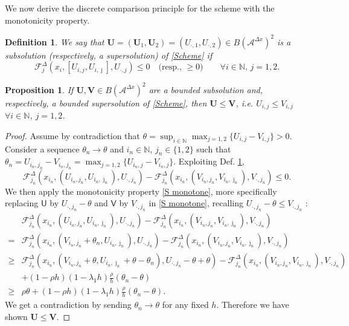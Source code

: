 \documentclass[11pt]{article}
\numberwithin{equation}{section}
\newtheorem{proposition}[theorem]{Proposition}
\newtheorem{definition}[theorem]{Definition}
\theoremstyle{Claim}
\newcommand{\N}{\mathbb{N}}
\newcommand{\mA}{\mathcal A}
\def\sU{{\mathsf{U}}}
\def\sV{{\mathsf{V}}}
\def\bV{{\mathbf{V}}}
\def\bjm{{\bar{\jmath}}}
\newcommand{\bU}{\mathbf{U}}
\theoremstyle{plain}
\newcommand{\D}{\Delta}
\newcommand{\Dx}{{\Delta x}}
\begin{document}
We now derive the discrete comparison principle for the scheme with the monotonicity property. 
\begin{definition}\label{def:sol_scheme}
	We say that $\mathbf{U}=(\bU_1,\bU_2)=(U_{\cdot,1},U_{\cdot,2})\in B(\mA^\Dx)^2$ is a subsolution (respectively, a supersolution) of \eqref{Scheme} if 
	\[	\mathcal{F}^\D_j(x_i,[U_{i,j},U_{i,\bar \jmath}],U_{\cdot,j})\le 0 \quad\text{(resp., $\ge 0$)}\qquad \forall i\in\N, \,j=1,2.\]
\end{definition}
\begin{proposition}\label{prop:comparison}
	If $\bU, \bV\in B(\mA^\Dx)^2$ are a bounded subsolution and, respectively, a bounded supersolution of \eqref{Scheme}, then $\bU\le \bV$, i.e. $U_{i,j}\le V_{i,j}$ $\forall i\in\N$, $j=1,2$.
\end{proposition}
\begin{proof}
	Assume by contradiction that $\theta=\sup_{i\in\N}\max_{j=1,2}\{U_{i,j}-V_{i,j}\}>0$. Consider a sequence $\theta_n\to \theta$ and $i_n\in\N$, $j_n\in \{1,2\}$ such that
	$
	\theta_n=U_{i_n,j_n}-V_{i_n,j_n}=\max_{j=1,2}\{U_{i_n,j}-V_{i_n,j}\}
	$.
	Exploiting  Def. \ref{def:sol_scheme},
$$
	 \mathcal{F}^\D_{j_n}(x_{i_n},(U_{i_n,j_n},U_{i_n,\bjm_n}),U_{\cdot,j_n})-\mathcal{F}^\D_{j_n}(x_{i_n},(V_{i_n,j_n},V_{i_n,\bjm_n}),V_{\cdot,j_n})\leq 0.
$$		
We then apply the monotonicity property \eqref{S monotone}, more specifically replacing $\sU$ by $U_{\cdot,j_n}-\theta$ and $\sV$ by $V_{\cdot,j_n}$ in \eqref{S monotone}, recalling $U_{\cdot,j_n}-\theta\leq V_{\cdot,j_n}$ :
\begin{align*}		
& \mathcal{F}^\D_{j_n}(x_{i_n},(U_{i_n,j_n},U_{i_n,\bjm_n}),U_{\cdot,j_n})-\mathcal{F}^\D_{j_n}(x_{i_n},(V_{i_n,j_n},V_{i_n,\bjm_n}),V_{\cdot,j_n})\\
={}&\mathcal{F}^\D_{j_n}(x_{i_n},(V_{i_n,j_n}+\theta_n,U_{i_n,\bjm_n}),U_{\cdot,j_n})-\mathcal{F}^\D_{j_n}(x_{i_n},(V_{i_n,j_n},V_{i_n,\bjm_n}),V_{\cdot,j_n})\\
\geq {}&\mathcal{F}^\D_{j_n}(x_{i_n},(V_{i_n,j_n}+\theta,U_{i_n,\bjm_n}+\theta-\theta_n),U_{\cdot,j_n}-\theta+\theta)-\mathcal{F}^\D_{j_n}(x_{i_n},(V_{i_n,j_n},V_{i_n,\bjm_n}),V_{\cdot,j_n})\\
&+(1-\rho h)(1-\lambda_1h)\frac{\rho}{h}(\theta_n-\theta)\\
\ge {}&\rho \theta+(1-\rho h)(1-\lambda_1h)\frac{\rho}{h}(\theta_n-\theta).		
\end{align*}
We get a contradiction by sending $\theta_n\to \theta$ for any fixed $h$. Therefore we have shown $\bU\le \bV$.	
\end{proof}
\end{document}
